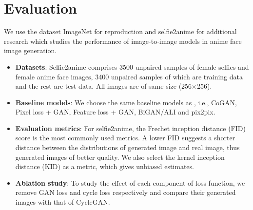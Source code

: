 \section{Evaluation}
We use the dataset ImageNet for reproduction and selfie2anime for additional research which studies the performance of image-to-image models in anime face image generation.

\begin{itemize}
    \item \textbf{Datasets}: 
    Selfie2anime comprises 3500 unpaired samples of female selfies and female anime face images, 3400 unpaired samples of which are training data and the rest are test data. All images are of same size (256×256).
    \item \textbf{Baseline models}: 
    We choose the same baseline models as \cite{zhu_unpaired_2017}, i.e., CoGAN, Pixel loss + GAN, Feature loss + GAN, BiGAN/ALI and pix2pix.
    \item \textbf{Evaluation metrics}: 
    For selfie2anime, the Frechet inception distance (FID) score is the most commonly used metrics. A lower FID suggests a shorter distance between the distributions of generated image and real image, thus generated images of better quality\cite{sym12101705}. We also select the kernel inception distance (KID) as a metric, which gives unbiased estimates.
    \item \textbf{Ablation study}: 
    To study the effect of each component of loss function, we remove GAN loss and cycle loss respectively and compare their generated images with that of CycleGAN.
\end{itemize}




